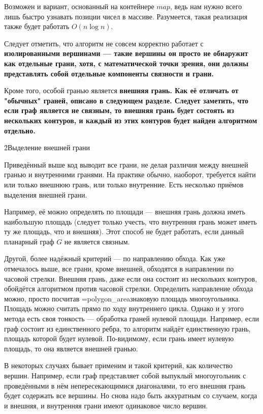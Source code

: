 Возможен и вариант, основанный на контейнере $map$, ведь нам нужно всего лишь быстро узнавать позиции чисел в массиве. Разумеется, такая реализация также будет работать $O(n \log n)$.

Следует отметить, что алгоритм не совсем корректно работает с \bf{изолированными} вершинами --- такие вершины он просто не обнаружит как отдельные грани, хотя, с математической точки зрения, они должны представлять собой отдельные компоненты связности и грани.

Кроме того, особой гранью является \bf{внешняя грань}. Как её отличать от "обычных" граней, описано в следующем разделе. Следует заметить, что если граф является не связным, то внешняя грань будет состоять из нескольких контуров, и каждый из этих контуров будет найден алгоритмом отдельно.


\h2{Выделение внешней грани}

Приведённый выше код выводит все грани, не делая различия между внешней гранью и внутренними гранями. На практике обычно, наоборот, требуется найти или только внешнюю грань, или только внутренние. Есть несколько приёмов выделения внешней грани.

Например, её можно определять по площади --- внешняя грань должна иметь наибольшую площадь (следует только учесть, что внутренняя грань может иметь ту же площадь, что и внешняя). Этот способ не будет работать, если данный планарный граф $G$ не является связным.

Другой, более надёжный критерий --- по направлению обхода. Как уже отмечалось выше, все грани, кроме внешней, обходятся в направлении по часовой стрелки. Внешняя грань, даже если она состоит из нескольких контуров, обойдётся алгоритмом против часовой стрелки. Определить направление обхода можно, просто посчитав \algohref=polygon_area{знаковую площадь многоугольника}. Площадь можно считать прямо по ходу внутреннего цикла. Однако и у этого метода есть своя тонкость --- обработка граней нулевой площади. Например, если граф состоит из единственного ребра, то алгоритм найдёт единственную грань, площадь которой будет нулевой. По-видимому, если грань имеет нулевую площадь, то она является внешней гранью.

В некоторых случаях бывает применим и такой критерий, как количество вершин. Например, если граф представляет собой выпуклый многоугольник с проведёнными в нём непересекающимися диагоналями, то его внешняя грань будет содержать все вершины. Но снова надо быть аккуратным со случаем, когда и внешняя, и внутренняя грани имеют одинаковое число вершин.

